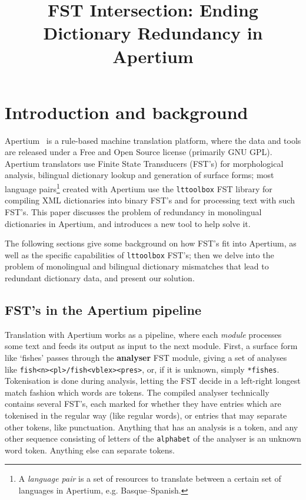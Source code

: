 \documentclass[10pt, a4paper]{article}
\title{FST Intersection: Ending Dictionary Redundancy in Apertium} %
\newcommand{\ana}[1]{\texttt{#1}}
\newcommand{\f}[1]{`#1'}
\newcommand{\tool}[1]{\texttt{#1}}
\begin{document}
\maketitleabstract

\section{Introduction and background}

Apertium~\cite{forcada2011afp} is a rule-based machine translation
platform, where the data and tools are released under a Free and Open
Source license (primarily GNU GPL). Apertium translators use Finite
State Transducers (FST's) for morphological analysis, bilingual
dictionary lookup and generation of surface forms; most language
pairs\footnote{A \emph{language pair} is a set of resources to
    translate between a certain set of languages in Apertium, e.g.
Basque--Spanish.} created with Apertium use the \tool{lttoolbox} FST
library for compiling XML dictionaries into binary FST's and for
processing text with such FST's. This paper discusses the problem of
redundancy in monolingual dictionaries in Apertium, and introduces a
new tool to help solve it.

The following sections give some background on how FST's fit into
Apertium, as well as the specific capabilities of \tool{lttoolbox}
FST's; then we delve into the problem of monolingual and bilingual
dictionary mismatches that lead to redundant dictionary data, and
present our solution.

\subsection{FST's in the Apertium pipeline}
\label{sec:pipeline}

Translation with Apertium works as a pipeline, where each
\emph{module} processes some text and feeds its output as input to the
next module. First, a surface form like \f{fishes} passes through the
\textbf{analyser} FST module, giving a set of analyses like
\ana{fish<n><pl>/fish<vblex><pres>}, or, if it is unknown, simply
\ana{*fishes}. Tokenisation is done during analysis, letting the FST
decide in a left-right longest match fashion which words are tokens.
The compiled analyser technically contains several FST's, each marked
for whether they have entries which are tokenised in the regular
way (like regular words), or entries that may separate other tokens,
like punctuation. Anything that has an analysis is a token, and any
other sequence consisting of letters of the \texttt{alphabet} of the
analyser is an unknown word token. Anything else can separate tokens.
\end{document}
